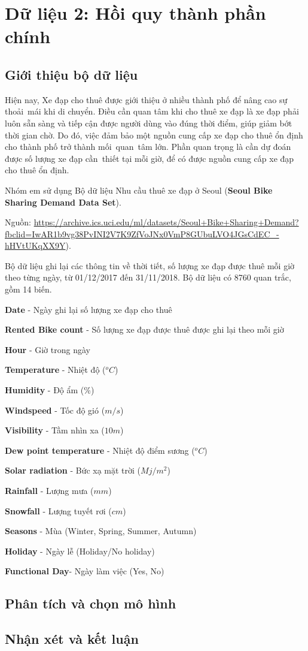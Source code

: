 \section{Dữ liệu 2: Hồi quy thành phần chính}

\subsection{Giới thiệu bộ dữ liệu}
Hiện nay, Xe đạp cho thuê được giới thiệu ở nhiều thành phố để nâng cao sự thoải~mái khi di chuyển. Điều cần quan tâm khi cho thuê xe đạp là xe đạp phải luôn sẵn sàng và tiếp cận được người dùng vào đúng thời điểm, giúp giảm bớt thời gian chờ. Do đó, việc đảm bảo  một nguồn cung cấp xe đạp cho thuê ổn định cho thành phố trở thành mối~quan~tâm lớn. Phần quan trọng là cần dự đoán được số lượng xe đạp cần~thiết tại mỗi giờ, để có được nguồn cung cấp xe đạp cho thuê ổn định.

Nhóm em sử dụng Bộ dữ liệu Nhu cầu thuê xe đạp ở Seoul (\textbf{Seoul Bike Sharing Demand Data Set}).

Nguồn: \url{https://archive.ics.uci.edu/ml/datasets/Seoul+Bike+Sharing+Demand?fbclid=IwAR1b9vg38PvINI2V7K9ZfVoJNx0VmP8GUbuLVO4JGsCdEC\_-hHVtUKqXX9Y}).

Bộ dữ liệu ghi lại các thông tin về thời tiết, số lượng xe đạp được thuê mỗi giờ theo từng ngày, từ 01/12/2017 đến 31/11/2018. Bộ dữ liệu có 8760 quan trắc, gồm 14 biến.

\textbf{Date} - Ngày ghi lại số lượng xe đạp cho thuê

\textbf{Rented Bike count} - Số lượng xe đạp được thuê được ghi lại theo mỗi giờ

\textbf{Hour} - Giờ trong ngày

\textbf{Temperature} - Nhiệt độ ($^o C$)

\textbf{Humidity} - Độ ẩm (\%)

\textbf{Windspeed} - Tốc độ gió ($m/s$)

\textbf{Visibility} - Tầm nhìn xa ($10m$)

\textbf{Dew point temperature} - Nhiệt độ điểm sương ($^o C$)

\textbf{Solar radiation} - Bức xạ mặt trời ($Mj/m^2$)

\textbf{Rainfall} - Lượng mưa ($mm$)

\textbf{Snowfall} - Lượng tuyết rơi ($cm$)

\textbf{Seasons} - Mùa (Winter, Spring, Summer, Autumn)

\textbf{Holiday} - Ngày lễ (Holiday/No holiday)

\textbf{Functional Day}- Ngày làm việc (Yes, No)

\subsection*{Phân tích và chọn mô hình}

\subsection*{Nhận xét và kết luận}